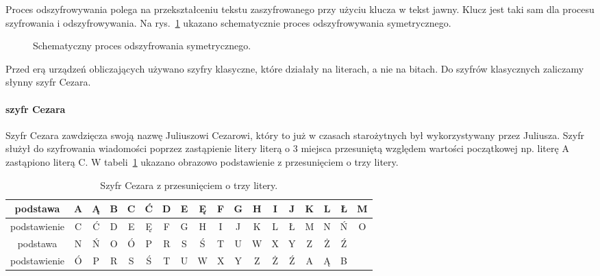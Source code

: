 \documentclass[12p]{article}
\begin{document}
Proces odszyfrowywania polega na przekształceniu tekstu zaszyfrowanego przy użyciu klucza w tekst jawny. Klucz jest taki sam dla procesu szyfrowania i odszyfrowywania. Na rys.~\ref{odszyfrowanie} ukazano schematycznie proces odszyfrowywania symetrycznego.
\newline
\begin{figure}[H]
\begin{center}
\end{center}
\caption{Schematyczny proces odszyfrowania symetrycznego.}\label{odszyfrowanie}
\end{figure}

Przed erą urządzeń obliczających używano szyfry klasyczne, które działały na literach, a nie na bitach. Do szyfrów klasycznych zaliczamy słynny szyfr Cezara.
\paragraph{szyfr Cezara}
\quad 

Szyfr Cezara zawdzięcza swoją nazwę Juliuszowi Cezarowi, który to już w czasach starożytnych był wykorzystywany przez Juliusza. Szyfr służył do szyfrowania wiadomości poprzez zastąpienie litery literą o 3 miejsca przesuniętą względem wartości początkowej np. literę A zastąpiono literą C. W tabeli~\ref{cezar} ukazano obrazowo podstawienie z przesunięciem o trzy litery.

\begin{table}[H]
\centering
\begin{tabular}{|c|c|c|c|c|c|c|c|c|c|c|c|c|c|c|c|c|c|}
\hline
podstawa & A & Ą & B & C & Ć & D & E & Ę & F & G & H & I & J & K & L & Ł & M \\
\hline 
\hline
podstawienie & C & Ć & D & E & Ę & F & G & H & I & J & K & L & Ł & M & N & Ń & O \\
\hline
\hline
podstawa & N & Ń & O & Ó & P & R & S & Ś & T & U & W & X & Y & Z & Ż & Ź & \\
\hline 
\hline
podstawienie & Ó & P & R & S & Ś & T & U & W & X & Y & Z & Ż & Ź & A & Ą & B & \\
\hline
\end{tabular}
\caption{Szyfr Cezara z przesunięciem o trzy litery.}~\label{cezar}
\end{table}
\end{document}
